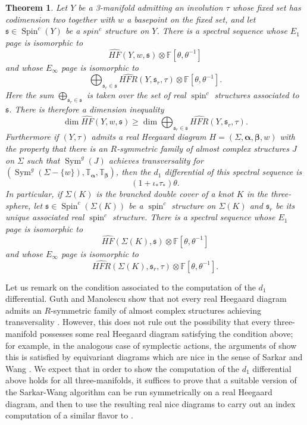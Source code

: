 \documentclass[11pt,reqno]{amsart}
\newtheorem{thm}{Theorem}[section]
\theoremstyle{definition}
\theoremstyle{remark}
\newcommand{\T}{\mathbb{T}}
\DeclareMathOperator{\spin}{{spin}}
\DeclareMathOperator{\Spin}{{Spin}}
\DeclareMathOperator{\Sym}{{Sym}}
\newcommand{\bF}{\mathbb{F}}
\newcommand{\alphas}{\boldsymbol \alpha}
\newcommand{\betas}{\boldsymbol \beta}
\newcommand{\HF}{\mathit{HF}}
\newcommand{\HFR}{\mathit{HFR}}
\newcommand{\HFRhat}{\widehat{\HFR}}
\newcommand\HFhat{\widehat{\HF}}
\numberwithin{equation}{section}
\begin{document}
\begin{thm} \label{thm:branched} Let $Y$ be a 3-manifold admitting an involution $\tau$ whose fixed set has codimension two together with $w$ a basepoint on the fixed set, and let $\mathfrak s \in \Spin^c(Y)$ be a $spin^c$ structure on $Y$. There is a spectral sequence whose $E_1$ page is isomorphic to 
%
\[ \HFhat(Y,w, \mathfrak s) \otimes \bF[\theta, \theta^{-1}] \]
%
and whose $E_{\infty}$ page is isomorphic to
%
\[ \bigoplus_{\mathfrak s_r \in \mathfrak s}\HFRhat(Y, \mathfrak s_r, \tau) \otimes \bF[\theta, \theta^{-1}].\]
%
Here the sum $\bigoplus_{\mathfrak s_r \in \mathfrak s}$ is taken over the set of real $\spin^c$ structures associated to $\mathfrak s$. There is therefore a dimension inequality
%
\[ \dim \HFhat(Y,w, \mathfrak s)  \geq \dim \bigoplus_{\mathfrak s_r \in \mathfrak s}\HFRhat(Y, \mathfrak s_r, \tau).\]
%
Furthermore if $(Y,\tau)$ admits a real Heegaard diagram $H = (\Sigma, \alphas, \betas, w)$ with the property that there is an $R$-symmetric family of almost complex structures $J$ on $\Sigma$ such that $\Sym^g(J)$ achieves transversality for $(\Sym^g(\Sigma -\{w\}), \T_{\alphas}, \T_{\betas})$, then the $d_1$ differential of this spectral sequence is
%
\[ (1+\iota_* \tau_*)\theta.\]
%
In particular, if $\Sigma(K)$ is the branched double cover of a knot $K$ in the three-sphere, let $\mathfrak s \in \Spin^c(\Sigma(K))$ be a $\spin^c$ structure on $\Sigma(K)$ and $\mathfrak s_r$ be its unique associated real $\spin^c$ structure. There is a spectral sequence whose $E_1$ page is isomorphic to
%
\[ \HFhat(\Sigma(K), \mathfrak s) \otimes \bF[\theta, \theta^{-1}]\]
%
and whose $E_{\infty}$ page is isomorphic to 
%
\[ \HFRhat(\Sigma(K), \mathfrak s_r, \tau) \otimes \bF[\theta, \theta^{-1}]. \]
%
\end{thm}

Let us remark on the condition associated to the computation of the $d_1$ differential. Guth and Manolescu show that not every real Heegaard diagram admits an $R$-symmetric family of almost complex structures achieving transversality \cite[Remark 2.4 and Example 4.7]{GM:real}. However, this does not rule out the possibility that every three-manifold possesses some real Heegaard diagram satisfying the condition above; for example, in the analogous case of symplectic actions, the arguments of \cite[Section 5.2]{HLS-equivariant} show this is satisfied by equivariant diagrams which are nice in the sense of Sarkar and Wang \cite{SW:nice}. We expect that in order to show the computation of the $d_1$ differential above holds for all three-manifolds, it suffices to prove that a suitable version of the Sarkar-Wang algorithm can be run symmetrically on a real Heegaard diagram, and then to use the resulting real nice diagrams to carry out an index computation of a similar flavor to \cite[Section 5.2]{HLS-equivariant}.
\end{document}
